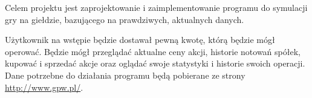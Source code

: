 Celem projektu jest zaprojektowanie i zaimplementowanie programu do symulacji gry na giełdzie,
bazującego na prawdziwych, aktualnych danych.

Użytkownik na wstępie będzie dostawał pewną kwotę, którą będzie mógł operować. Będzie mógł przeglądać
aktualne ceny akcji, historie notowań spółek, kupować i sprzedać akcje oraz oglądać swoje statystyki
i historie swoich operacji. Dane potrzebne do działania programu będą pobierane ze strony 
\url{http://www.gpw.pl/}.

